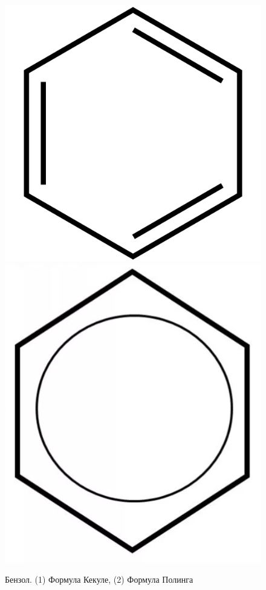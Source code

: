 \begin{enumerate}[1.]
    \begin{figure}[ht!] 
    	\center
    	\includegraphics [scale=0.16] {my_folder/images/benzol_kekule}
    	\includegraphics [scale=0.28] {my_folder/images/benzol_poling}
    	\caption{Бензол. (1) Формула Кекуле, (2) Формула Полинга} 
    	\label{fig:benzol}
    \end{figure}
\end{enumerate}

